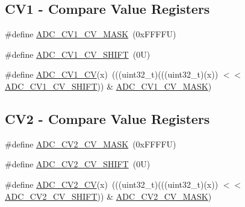\subsection*{C\+V1 -\/ Compare Value Registers}
\begin{DoxyCompactItemize}
\item 
\#define \mbox{\hyperlink{group___a_d_c___register___masks_gad67c3b5f385cd9b26be8257134e1e3cf}{A\+D\+C\+\_\+\+C\+V1\+\_\+\+C\+V\+\_\+\+M\+A\+SK}}~(0x\+F\+F\+F\+F\+U)
\item 
\#define \mbox{\hyperlink{group___a_d_c___register___masks_ga1925520ab1dd2eb81e0e4505af905c13}{A\+D\+C\+\_\+\+C\+V1\+\_\+\+C\+V\+\_\+\+S\+H\+I\+FT}}~(0\+U)
\item 
\#define \mbox{\hyperlink{group___a_d_c___register___masks_ga941b887791f6ce780cb100ff3ef98407}{A\+D\+C\+\_\+\+C\+V1\+\_\+\+CV}}(x)~(((uint32\+\_\+t)(((uint32\+\_\+t)(x)) $<$$<$ \mbox{\hyperlink{group___a_d_c___register___masks_ga1925520ab1dd2eb81e0e4505af905c13}{A\+D\+C\+\_\+\+C\+V1\+\_\+\+C\+V\+\_\+\+S\+H\+I\+FT}})) \& \mbox{\hyperlink{group___a_d_c___register___masks_gad67c3b5f385cd9b26be8257134e1e3cf}{A\+D\+C\+\_\+\+C\+V1\+\_\+\+C\+V\+\_\+\+M\+A\+SK}})
\end{DoxyCompactItemize}
\subsection*{C\+V2 -\/ Compare Value Registers}
\begin{DoxyCompactItemize}
\item 
\#define \mbox{\hyperlink{group___a_d_c___register___masks_gab61d022e3c8d84d77f2895a91c049023}{A\+D\+C\+\_\+\+C\+V2\+\_\+\+C\+V\+\_\+\+M\+A\+SK}}~(0x\+F\+F\+F\+F\+U)
\item 
\#define \mbox{\hyperlink{group___a_d_c___register___masks_ga5ecccc775bd06291531df6e989024d38}{A\+D\+C\+\_\+\+C\+V2\+\_\+\+C\+V\+\_\+\+S\+H\+I\+FT}}~(0\+U)
\item 
\#define \mbox{\hyperlink{group___a_d_c___register___masks_gaa4d71a13e422a14048307c0acab90841}{A\+D\+C\+\_\+\+C\+V2\+\_\+\+CV}}(x)~(((uint32\+\_\+t)(((uint32\+\_\+t)(x)) $<$$<$ \mbox{\hyperlink{group___a_d_c___register___masks_ga5ecccc775bd06291531df6e989024d38}{A\+D\+C\+\_\+\+C\+V2\+\_\+\+C\+V\+\_\+\+S\+H\+I\+FT}})) \& \mbox{\hyperlink{group___a_d_c___register___masks_gab61d022e3c8d84d77f2895a91c049023}{A\+D\+C\+\_\+\+C\+V2\+\_\+\+C\+V\+\_\+\+M\+A\+SK}})
\end{DoxyCompactItemize}
